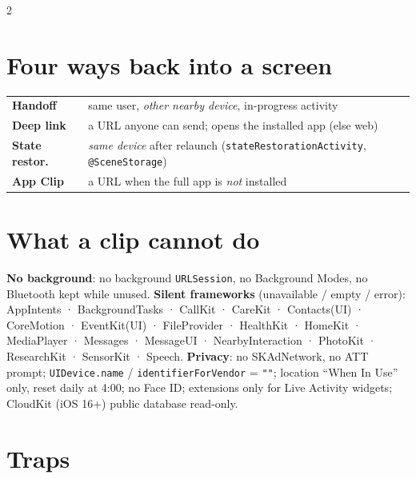 \documentclass[8pt]{extarticle}
\begin{document}
\begin{multicols}{2}
\section{Four ways back into a screen}
{\footnotesize
\begin{tabular}{@{}>{\raggedright\arraybackslash}p{15mm}>{\raggedright\arraybackslash}p{57mm}@{}}
\toprule
\textbf{Handoff} & same user, \emph{other nearby device}, in-progress activity \\
\textbf{Deep link} & a URL anyone can send; opens the installed app (else web) \\
\textbf{State restor.} & \emph{same device} after relaunch (\texttt{stateRestorationActivity}, \texttt{@SceneStorage}) \\
\textbf{App Clip} & a URL when the full app is \emph{not} installed \\
\bottomrule
\end{tabular}}

\section{What a clip cannot do}
{\footnotesize
\textbf{No background}: no background \texttt{URLSession}, no Background Modes, no Bluetooth kept while unused.
\textbf{Silent frameworks} (unavailable / empty / error): AppIntents · BackgroundTasks · CallKit · CareKit ·
Contacts(UI) · CoreMotion · EventKit(UI) · FileProvider · HealthKit · HomeKit · MediaPlayer · Messages ·
MessageUI · NearbyInteraction · PhotoKit · ResearchKit · SensorKit · Speech.
\textbf{Privacy}: no SKAdNetwork, no ATT prompt; \texttt{UIDevice.name} / \texttt{identifierForVendor} = \texttt{""};
location ``When In Use'' only, reset daily at 4:00; no Face ID; extensions only for Live Activity widgets;
CloudKit (iOS 16+) public database read-only.\par}

\section{Traps}
\begin{itemize}
\end{itemize}


\end{multicols}
\end{document}
